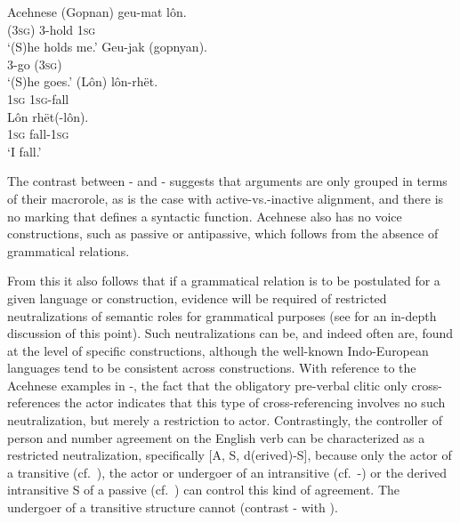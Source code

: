 \documentclass[output=paper,hidelinks]{langscibook}
\begin{document}
\ea%
   \label{ex:RRG:14}Acehnese \citep[255-256]{VanValin1997}
\ea\label{ex:RRG:14a} \gll (Gopnan)  geu-mat  lôn.\\
   (3\textsc{sg})  3-hold  1\textsc{sg}\\
\glt `(S)he holds me.'
\ex\label{ex:RRG:14b} \gll Geu-jak  (gopnyan).\\
3-go  (3\textsc{sg})\\
\glt `(S)he goes.'
\ex\label{ex:RRG:14c} \gll *(Lôn)  lôn-rhët.\\
     1\textsc{sg}   \textsc{1sg}{}-fall\\
\ex\label{ex:RRG:14d} \gll Lôn  rhët(-lôn).\\
1\textsc{sg}  fall-\textsc{1sg}\\
\glt `I fall.'
     \z\z

\noindent  The contrast between - and - suggests that arguments are only grouped in terms of their macrorole, as is the case with active-vs.-inactive alignment, and there is no marking that defines a syntactic function. Acehnese also has no voice constructions, such as passive or antipassive, which follows from the absence of grammatical relations.

  From this it also follows that if a grammatical relation is to be postulated for a given language or construction, evidence will be required of restricted neutralizations of semantic roles for grammatical purposes (see \citealt{LaPolla2022} for an in-depth discussion of this point). Such neutralizations can be, and indeed often are, found at the level of specific constructions, although the well-known Indo-European languages tend to be consistent across constructions. With reference to the Acehnese examples in -, the fact that the obligatory pre-verbal clitic only cross-references the actor indicates that this type of cross-referencing involves no such neutralization, but merely a restriction to actor.  Contrastingly, the controller of person and number agreement on the English verb can be characterized as a restricted neutralization, specifically [A, S, d(erived)-S], because only the actor of a transitive (cf.\ ), the actor or undergoer of an intransitive (cf.\ -) or the derived intransitive S of a passive (cf.\ ) can control this kind of agreement. The undergoer of a transitive structure cannot (contrast - with ).
\end{document}
